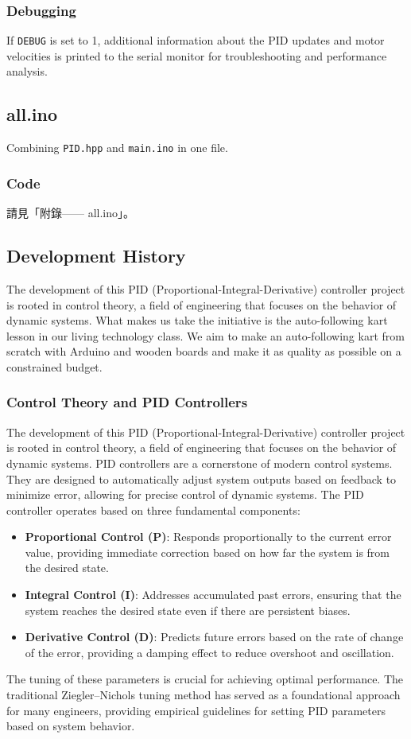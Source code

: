 \documentclass[a4paper,12pt]{article}
\begin{document}
\subsubsection{Debugging}
If \texttt{DEBUG} is set to 1, additional information about the PID updates and motor velocities is printed to the serial monitor for troubleshooting and performance analysis.
\subsection{all.ino}
Combining \texttt{PID.hpp} and \texttt{main.ino} in one file.
\subsubsection{Code}
請見「附錄—— all.ino」。
\subsection{Development History}
The development of this PID (Proportional-Integral-Derivative) controller project is rooted in control theory, a field of engineering that focuses on the behavior of dynamic systems. What makes us take the initiative is the auto-following kart lesson in our living technology class. We aim to make an auto-following kart from scratch with Arduino and wooden boards and make it as quality as possible on a constrained budget.
\subsubsection{Control Theory and PID Controllers}
The development of this PID (Proportional-Integral-Derivative) controller project is rooted in control theory, a field of engineering that focuses on the behavior of dynamic systems. PID controllers are a cornerstone of modern control systems. They are designed to automatically adjust system outputs based on feedback to minimize error, allowing for precise control of dynamic systems. The PID controller operates based on three fundamental components:
\begin{itemize}
\item \textbf{Proportional Control (P)}: Responds proportionally to the current error value, providing immediate correction based on how far the system is from the desired state.
\item \textbf{Integral Control (I)}: Addresses accumulated past errors, ensuring that the system reaches the desired state even if there are persistent biases.
\item \textbf{Derivative Control (D)}: Predicts future errors based on the rate of change of the error, providing a damping effect to reduce overshoot and oscillation.
\end{itemize}
The tuning of these parameters is crucial for achieving optimal performance. The traditional Ziegler–Nichols tuning method has served as a foundational approach for many engineers, providing empirical guidelines for setting PID parameters based on system behavior.
\end{document}
